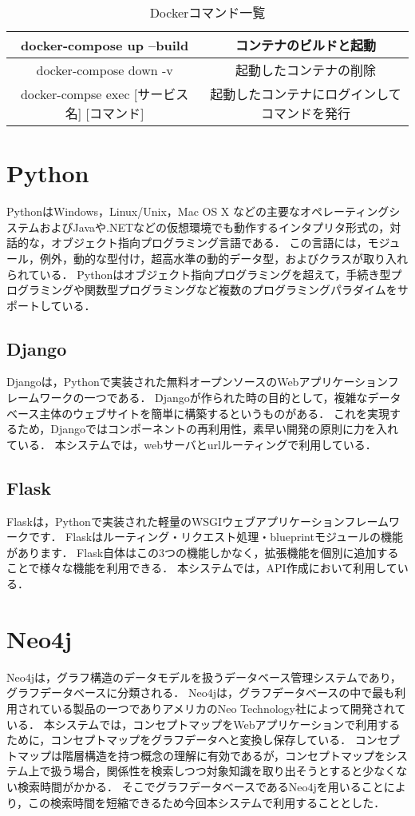 \begin{table}[htb]
\centering
\caption{Dockerコマンド一覧}
\label{tab:docker_cmd}
\begin{tabular}{|c|c|}  \hline
    docker-compose up --build & コンテナのビルドと起動 \\ \hline
    docker-compose down -v & 起動したコンテナの削除 \\ \hline
    docker-compse exec [サービス名] [コマンド] & 起動したコンテナにログインしてコマンドを発行 \\ \hline		  
\end{tabular}
\end{table}

\section{Python}\label{sec:python}
Python\cite{python}はWindows，Linux/Unix，Mac OS X などの主要なオペレーティングシステムおよびJavaや.NETなどの仮想環境でも動作するインタプリタ形式の，対話的な，オブジェクト指向プログラミング言語である．
この言語には，モジュール，例外，動的な型付け，超高水準の動的データ型，およびクラスが取り入れられている．
Pythonはオブジェクト指向プログラミングを超えて，手続き型プログラミングや関数型プログラミングなど複数のプログラミングパラダイムをサポートしている．

\subsection{Django}
Django\cite{Django}は，Pythonで実装された無料オープンソースのWebアプリケーションフレームワークの一つである．
Djangoが作られた時の目的として，複雑なデータベース主体のウェブサイトを簡単に構築するというものがある．
これを実現するため，Djangoではコンポーネントの再利用性，素早い開発の原則に力を入れている．
本システムでは，webサーバとurlルーティングで利用している．

\subsection{Flask}
Flask\cite{flask}は，Pythonで実装された軽量のWSGI\cite{wsgi}ウェブアプリケーションフレームワークです．
Flaskはルーティング・リクエスト処理・blueprintモジュールの機能があります．
Flask自体はこの3つの機能しかなく，拡張機能を個別に追加することで様々な機能を利用できる．
本システムでは，API作成において利用している．

\section{Neo4j}\label{sec:neo4j}
Neo4j\cite{neo4j}は，グラフ構造のデータモデルを扱うデータベース管理システムであり，グラフデータベースに分類される．
Neo4jは，グラフデータベースの中で最も利用されている製品の一つでありアメリカのNeo Technology社によって開発されている．
本システムでは，コンセプトマップをWebアプリケーションで利用するために，コンセプトマップをグラフデータへと変換し保存している．
コンセプトマップは階層構造を持つ概念の理解に有効であるが，コンセプトマップをシステム上で扱う場合，関係性を検索しつつ対象知識を取り出そうとすると少なくない検索時間がかかる．
そこでグラフデータベースであるNeo4jを用いることにより，この検索時間を短縮できるため今回本システムで利用することとした．

